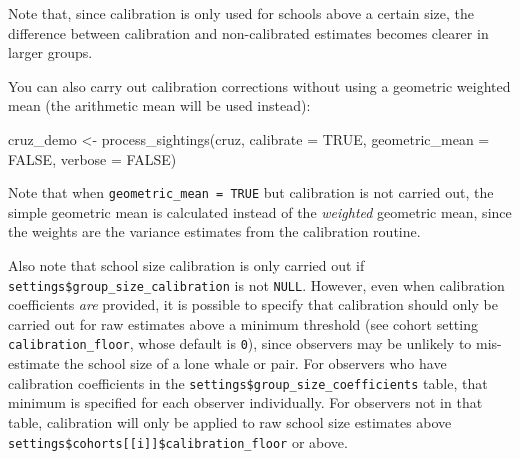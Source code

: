 \documentclass[
]{book}
\newenvironment{Shaded}{\begin{snugshade}}{\end{snugshade}}
\newcommand{\AttributeTok}[1]{\textcolor[rgb]{0.77,0.63,0.00}{#1}}
\newcommand{\ConstantTok}[1]{\textcolor[rgb]{0.00,0.00,0.00}{#1}}
\newcommand{\DecValTok}[1]{\textcolor[rgb]{0.00,0.00,0.81}{#1}}
\newcommand{\FloatTok}[1]{\textcolor[rgb]{0.00,0.00,0.81}{#1}}
\newcommand{\FunctionTok}[1]{\textcolor[rgb]{0.00,0.00,0.00}{#1}}
\newcommand{\NormalTok}[1]{#1}
\newcommand{\OtherTok}[1]{\textcolor[rgb]{0.56,0.35,0.01}{#1}}
\newcommand{\SpecialCharTok}[1]{\textcolor[rgb]{0.00,0.00,0.00}{#1}}
\begin{document}
Note that, since calibration is only used for schools above a certain size, the difference between calibration and non-calibrated estimates becomes clearer in larger groups.

You can also carry out calibration corrections without using a geometric weighted mean (the arithmetic mean will be used instead):

\begin{Shaded}
\begin{Highlighting}[]
\NormalTok{cruz\_demo }\OtherTok{\textless{}{-}} \FunctionTok{process\_sightings}\NormalTok{(cruz, }
                               \AttributeTok{calibrate =} \ConstantTok{TRUE}\NormalTok{,}
                               \AttributeTok{geometric\_mean =} \ConstantTok{FALSE}\NormalTok{,}
                               \AttributeTok{verbose =} \ConstantTok{FALSE}\NormalTok{)}
\end{Highlighting}
\end{Shaded}

\begin{Shaded}
\end{Shaded}

Note that when \texttt{geometric\_mean\ =\ TRUE} but calibration is not carried out, the simple geometric mean is calculated instead of the \emph{weighted} geometric mean, since the weights are the variance estimates from the calibration routine.

Also note that school size calibration is only carried out if \texttt{settings\$group\_size\_calibration} is not \texttt{NULL}. However, even when calibration coefficients \emph{are} provided, it is possible to specify that calibration should only be carried out for raw estimates above a minimum threshold (see cohort setting \texttt{calibration\_floor}, whose default is \texttt{0}), since observers may be unlikely to mis-estimate the school size of a lone whale or pair. For observers who have calibration coefficients in the \texttt{settings\$group\_size\_coefficients} table, that minimum is specified for each observer individually. For observers not in that table, calibration will only be applied to raw school size estimates above \texttt{settings\$cohorts{[}{[}i{]}{]}\$calibration\_floor} or above.
\end{document}
